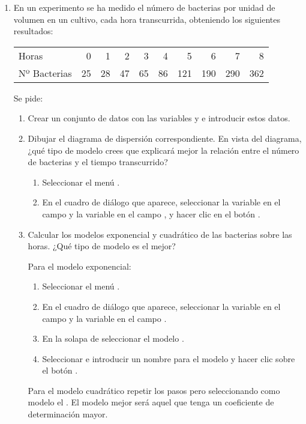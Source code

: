 \begin{enumerate}[leftmargin=*]
\item En un experimento se ha medido el número de bacterias por unidad de volumen en un cultivo, cada hora transcurrida,
obteniendo los siguientes resultados:
\begin{center}
\begin{tabular}{lrrrrrrrrr}
\hline
Horas & 0 & 1 & 2 & 3 & 4 & 5 & 6 & 7 & 8  \\
Nº Bacterias & 25 & 28 & 47 & 65 & 86 & 121 & 190 & 290 & 362\\
\hline
\end{tabular}
\end{center}

Se pide:
\begin{enumerate}
\item Crear un conjunto de datos con las variables  y  e introducir estos datos.

\item Dibujar el diagrama de dispersión correspondiente. En vista del diagrama, ¿qué tipo de modelo crees que explicará
mejor la relación entre el número de bacterias y el tiempo transcurrido? 
\begin{indicacion}{
\begin{enumerate}
\item Seleccionar el menú .
\item En el cuadro de diálogo que aparece, seleccionar la variable  en el campo 
y la variable  en el campo , y hacer clic en el botón .
\end{enumerate}}
\end{indicacion}

\item Calcular los modelos exponencial y cuadrático de las bacterias sobre las horas. ¿Qué tipo de modelo es el mejor?
\begin{indicacion}{
Para el modelo exponencial:
\begin{enumerate}
\item Seleccionar el menú .
\item En el cuadro de diálogo que aparece, seleccionar la variable  en el campo  y la variable  en el campo .
\item En la solapa de  seleccionar el modelo .
\item Seleccionar  e introducir un nombre para el modelo y hacer clic sobre el botón .
\end{enumerate}
Para el modelo cuadrático repetir los pasos pero seleccionando como modelo el . 
El modelo mejor será aquel que tenga un coeficiente de determinación mayor.
}
\end{indicacion}


\end{enumerate}
\end{enumerate}
